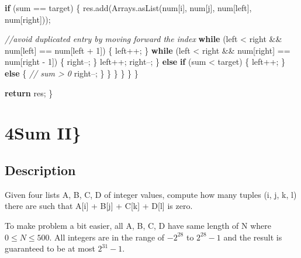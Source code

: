 \documentclass[]{book}
\newenvironment{Shaded}{\begin{snugshade}}{\end{snugshade}}
\newcommand{\BuiltInTok}[1]{#1}
\newcommand{\CommentTok}[1]{\textcolor[rgb]{0.56,0.35,0.01}{\textit{#1}}}
\newcommand{\DecValTok}[1]{\textcolor[rgb]{0.00,0.00,0.81}{#1}}
\newcommand{\FunctionTok}[1]{\textcolor[rgb]{0.00,0.00,0.00}{#1}}
\newcommand{\KeywordTok}[1]{\textcolor[rgb]{0.13,0.29,0.53}{\textbf{#1}}}
\newcommand{\NormalTok}[1]{#1}
\begin{document}
\begin{Shaded}
\begin{Highlighting}[]
                        \KeywordTok{if}\NormalTok{ (sum == target) \{}
\NormalTok{                            res.}\FunctionTok{add}\NormalTok{(}\BuiltInTok{Arrays}\NormalTok{.}\FunctionTok{asList}\NormalTok{(num[i], num[j], num[left], num[right]));}

                            \CommentTok{//avoid duplicated entry by moving forward the index}
                            \KeywordTok{while}\NormalTok{ (left < right && num[left] == num[left + }\DecValTok{1}\NormalTok{]) \{}
\NormalTok{                                left++;}
\NormalTok{                            \}}
                            \KeywordTok{while}\NormalTok{ (left < right && num[right] == num[right - }\DecValTok{1}\NormalTok{]) \{}
\NormalTok{                                right--;}
\NormalTok{                            \}}
\NormalTok{                            left++;}
\NormalTok{                            right--;}
\NormalTok{                        \} }\KeywordTok{else} \KeywordTok{if}\NormalTok{ (sum < target) \{}
\NormalTok{                            left++;}
\NormalTok{                        \} }\KeywordTok{else}\NormalTok{ \{}
                            \CommentTok{// sum > 0}
\NormalTok{                            right--;}
\NormalTok{                        \}}
\NormalTok{                    \}}
\NormalTok{                \}}
\NormalTok{            \}}
\NormalTok{        \}}
\NormalTok{    \}}

    \KeywordTok{return}\NormalTok{ res;}
\NormalTok{\}}
\end{Highlighting}
\end{Shaded}

\hypertarget{sum-ii}{%
\section{4Sum II\}}\label{sum-ii}}

\hypertarget{description-8}{%
\subsection{Description}\label{description-8}}

Given four lists A, B, C, D of integer values, compute how many tuples (i, j, k, l) there are such that
A{[}i{]} + B{[}j{]} + C{[}k{]} + D{[}l{]} is zero.

To make problem a bit easier, all A, B, C, D have same length of N where \(0 \le N \le 500\). All integers are
in the range of \(-2^{28}\) to \(2^{28} - 1\) and the result is guaranteed to be at most \(2^{31} - 1\).
\end{document}
